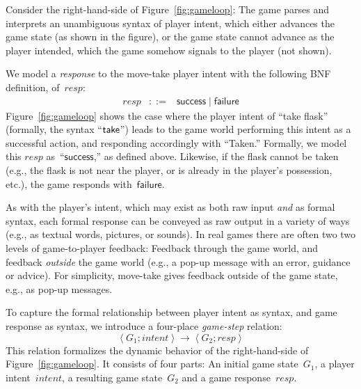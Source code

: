 \newcommand{\OmitThis}[1]{}

Consider the right-hand-side of Figure~\ref{fig:gameloop}: The game
parses and interprets an unambiguous syntax of player intent, which
either advances the game state (as shown in the figure), or the game
state cannot advance as the player intended, which the game somehow
signals to the player (not shown).

We model a \emph{response} to the move-take player intent with the
following BNF definition, of~$\mathit{resp}$:
%
  \begin{eqnarray*}
  \mathit{resp} &::=& \mathsf{success} \mid \mathsf{failure}
  \end{eqnarray*}
%
Figure~\ref{fig:gameloop} shows the case where the player intent of
``take flask'' (formally, the syntax ``$\mathsf{take}$'') leads to the game
world performing this intent as a successful action, and responding
accordingly with ``Taken.''
%
Formally, we model this $\mathit{resp}$ as~``$\mathsf{success}$,'' as
defined above.
%
Likewise, if the flask cannot be taken (e.g., the flask is not near
the player, or is already in the player's possession, etc.), the game
responds with~$\mathsf{failure}$.

As with the player's intent, which may exist as both raw input
\emph{and} as formal syntax, each formal response can be conveyed as
raw output in a variety of ways (e.g., as textual words, pictures, or
sounds).
%
In real games there are often two two levels of game-to-player
feedback:
%
Feedback through the game world, and feedback \emph{outside} the game
world (e.g., a pop-up message with an error, guidance or advice).
%
For simplicity, move-take gives feedback outside of the game state,
e.g., as pop-up messages.


\newcommand{\GameStep}[4]{
 \left< #1; #2 \right>
 \longrightarrow 
 \left< #3; #4 \right>
}

To capture the formal relationship between player intent as syntax,
and game response as syntax, we introduce a four-place
\emph{game-step} relation:
\[
\GameStep{G_1}{\mathit{intent}}{G_2}{\mathit{resp}}
\]
This relation formalizes the dynamic behavior of the right-hand-side
of Figure~\ref{fig:gameloop}.  It consists of four parts: An initial
game state~$G_1$, a player intent~$\mathit{intent}$, a resulting game
state~$G_2$ and a game response~$\mathit{resp}$.

